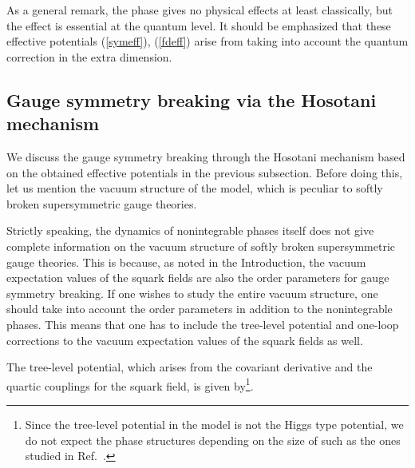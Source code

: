 \documentclass[a4paper,12pt]{article}
\begin{document}

\par
As a general remark, the phase \coordHE{} gives no physical 
effects at least classically, but the effect is essential at 
the quantum level. It should be emphasized that these effective 
potentials (\ref{symeff}), (\ref{fdeff})
arise from taking into account the quantum correction 
in the extra dimension.
\subsection{Gauge symmetry breaking via the Hosotani mechanism}
We discuss the gauge symmetry breaking through
the Hosotani mechanism based on the obtained effective potentials in the
previous subsection. Before doing this, let us mention 
the vacuum structure of the model, which is peculiar to softly broken
supersymmetric gauge theories. 
\par
Strictly speaking, the dynamics of nonintegrable phases
itself does not give complete information on the vacuum structure of 
softly broken supersymmetric gauge theories.
This is because, as noted in the Introduction, the vacuum 
expectation values of the squark fields \coordHE{} are also the order parameters for gauge symmetry 
breaking. If one wishes to study the entire vacuum structure, one should 
take into account the order 
parameters in addition to the nonintegrable phases.
This means that one has to include the
tree-level potential and one-loop corrections to the vacuum
expectation values of the squark fields as well. 
\par
The tree-level potential, which arises from the covariant 
derivative and the quartic couplings for the squark field, is 
given by\footnote{Since the tree-level potential in the model 
is not the Higgs type potential, we do not expect the phase structures 
depending on the size of \coordHE{} such as the ones studied 
in Ref.~\cite{sakamoto}.}.
\end{document}
